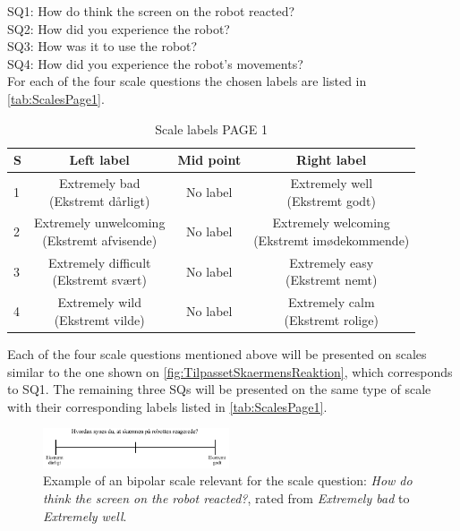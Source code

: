 \noindent
SQ1: How do think the screen on the robot reacted? \\%
SQ2: How did you experience the robot? \\ %
SQ3: How was it to use the robot?\\%
SQ4: How did you experience the robot's movements? \\%
For each of the four scale questions the chosen labels are listed in \autoref{tab:ScalesPage1}.
%
\begin{table}[H]
	\centering
\caption{Scale labels PAGE 1}
	\label{tab:ScalesPage1} 
	\begin{tabular}{l|c|c|c}
		S     & Left label & Mid point & Right label \\\hline
		1   & \makecell{Extremely bad\\(Ekstremt dårligt)}  & No label & \makecell{Extremely well \\(Ekstremt godt)}        \\\hline
		2   & \makecell{Extremely unwelcoming \\(Ekstremt afvisende)} & No label & \makecell{Extremely welcoming \\(Ekstremt imødekommende)}         \\\hline
		3   & \makecell{Extremely difficult \\(Ekstremt svært)} & No label & \makecell{Extremely easy \\(Ekstremt nemt)}         \\\hline
	 	4   & \makecell{Extremely wild \\(Ekstremt vilde)} & No label & \makecell{Extremely calm \\(Ekstremt rolige)}               
	\end{tabular}        
\end{table}
\noindent
%
Each of the four scale questions mentioned above will be presented on scales similar to the one shown on \autoref{fig:TilpassetSkaermensReaktion}, which corresponds to SQ1. The remaining three SQs will be presented on the same type of scale with their corresponding labels listed in \autoref{tab:ScalesPage1}.  
%
\begin{figure}[H]
\centering
\includegraphics[width = 0.49\textwidth]{Figure/TilpassetSkaermensReaktion}
\setlength{} 
\caption{Example of an bipolar scale relevant for the scale question: \textit{How do think the screen on the robot reacted?}, rated from \textit{Extremely bad} to \textit{Extremely well}.}
\label{fig:TilpassetSkaermensReaktion}
\end{figure}
